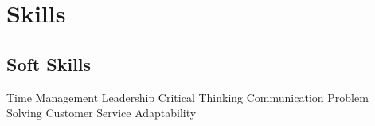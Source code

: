 
\section{Skills}


\subsection{Soft Skills}

Time Management \textbullet{} 
Leadership \textbullet{}
Critical Thinking \textbullet{}
Communication \textbullet{}
Problem Solving \textbullet{}
Customer Service \textbullet{}
Adaptability

\sectionspace




